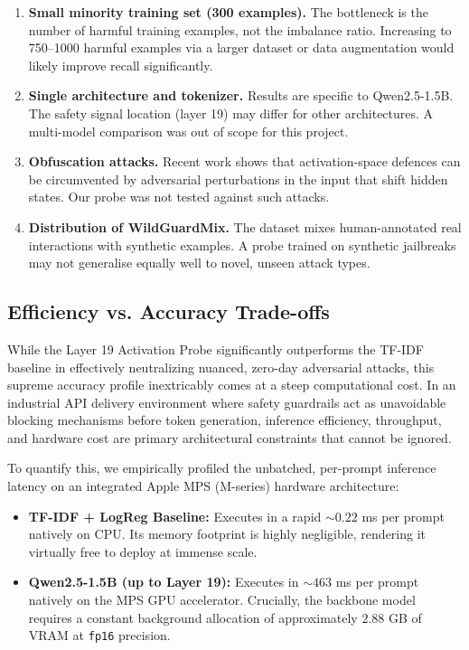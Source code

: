 \documentclass[11pt,a4paper]{article}
\begin{document}
\begin{enumerate}
  \item \textbf{Small minority training set (300 examples).}
        The bottleneck is the number of harmful training examples, not the
        imbalance ratio. Increasing to 750--1000 harmful examples via a larger
        dataset or data augmentation would likely improve recall significantly.

  \item \textbf{Single architecture and tokenizer.}
        Results are specific to Qwen2.5-1.5B. The safety signal location (layer 19)
        may differ for other architectures. A multi-model comparison was out of
        scope for this project.

  \item \textbf{Obfuscation attacks.}
        Recent work \citep{obfuscated} shows that activation-space defences can be
        circumvented by adversarial perturbations in the input that shift hidden
        states. Our probe was not tested against such attacks.

  \item \textbf{Distribution of WildGuardMix.}
        The dataset mixes human-annotated real interactions with synthetic examples.
        A probe trained on synthetic jailbreaks may not generalise equally well to
        novel, unseen attack types.
\end{enumerate}

\subsection{Efficiency vs. Accuracy Trade-offs}
\label{sec:efficiency}

While the Layer 19 Activation Probe significantly outperforms the TF-IDF baseline in effectively neutralizing nuanced, zero-day adversarial attacks, this supreme accuracy profile inextricably comes at a steep computational cost. In an industrial API delivery environment where safety guardrails act as unavoidable blocking mechanisms before token generation, inference efficiency, throughput, and hardware cost are primary architectural constraints that cannot be ignored.

To quantify this, we empirically profiled the unbatched, per-prompt inference latency on an integrated Apple MPS (M-series) hardware architecture:
\begin{itemize}[noitemsep]
  \item \textbf{TF-IDF + LogReg Baseline:} Executes in a rapid $\sim 0.22$ ms per prompt natively on CPU. Its memory footprint is highly negligible, rendering it virtually free to deploy at immense scale.
  \item \textbf{Qwen2.5-1.5B (up to Layer 19):} Executes in $\sim 463$ ms per prompt natively on the MPS GPU accelerator. Crucially, the backbone model requires a constant background allocation of approximately $2.88$ GB of VRAM at \texttt{fp16} precision.
\end{itemize}
\end{document}
